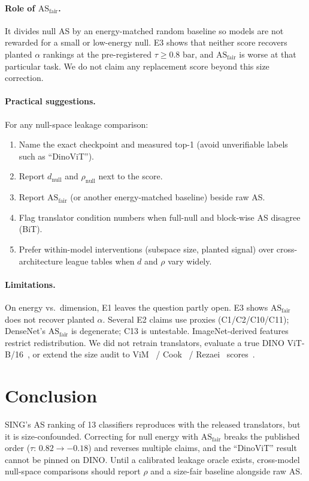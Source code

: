 \documentclass[10pt,twocolumn]{article}
\begin{document}
\paragraph{Role of $\mathrm{AS}_{\mathrm{fair}}$.}
It divides null AS by an energy-matched random baseline so models are not rewarded for a small or low-energy null.
E3 shows that neither score recovers planted $\alpha$ rankings at the pre-registered $\tau\ge0.8$ bar, and $\mathrm{AS}_{\mathrm{fair}}$ is worse at that particular task.
We do not claim any replacement score beyond this size correction.

\paragraph{Practical suggestions.}
For any null-space leakage comparison:
\begin{enumerate}
\item Name the exact checkpoint and measured top-1 (avoid unverifiable labels such as ``DinoViT'').
\item Report $d_{\mathrm{null}}$ and $\rho_{\mathrm{null}}$ next to the score.
\item Report $\mathrm{AS}_{\mathrm{fair}}$ (or another energy-matched baseline) beside raw AS.
\item Flag translator condition numbers when full-null and block-wise AS disagree (BiT).
\item Prefer within-model interventions (subspace size, planted signal) over cross-architecture league tables when $d$ and $\rho$ vary widely.
\end{enumerate}

\paragraph{Limitations.}
On energy vs.\ dimension, E1 leaves the question partly open.
E3 shows $\mathrm{AS}_{\mathrm{fair}}$ does not recover planted $\alpha$.
Several E2 claims use proxies (C1/C2/C10/C11); DenseNet's $\mathrm{AS}_{\mathrm{fair}}$ is degenerate; C13 is untestable.
ImageNet-derived features restrict redistribution.
We did not retrain translators, evaluate a true DINO ViT-B/16~\citep{dino2021}, or extend the size audit to ViM~\citep{vim2022} / Cook~\citep{cook2020} / Rezaei~\citep{rezaei2023} scores~\citep{makonnen2025}.

\section{Conclusion}
\vspace{-0.2em}
SING's AS ranking of 13 classifiers reproduces with the released translators, but it is size-confounded. Correcting for null energy with $\mathrm{AS}_{\mathrm{fair}}$ breaks the published order ($\tau{:}\,0.82\to{-}0.18$) and reverses multiple claims, and the ``DinoViT'' result cannot be pinned on DINO.
Until a calibrated leakage oracle exists, cross-model null-space comparisons should report $\rho$ and a size-fair baseline alongside raw AS.
\end{document}
